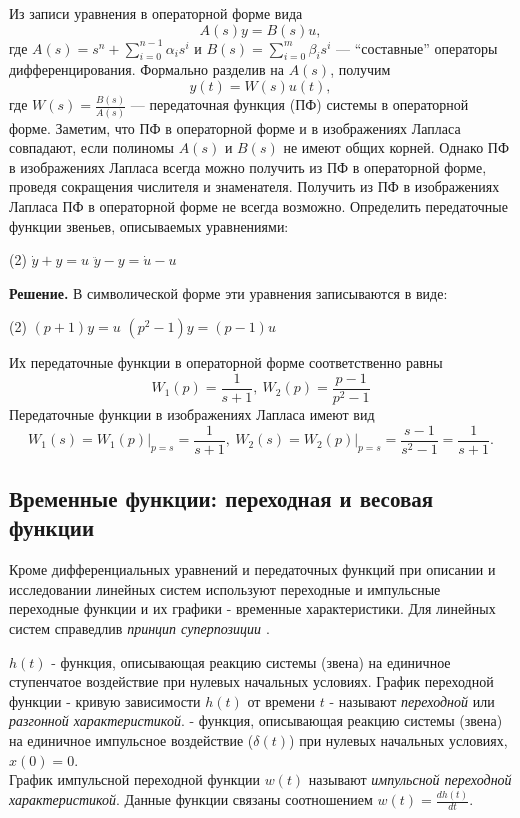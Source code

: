 \documentclass[../../TAU.tex]{subfiles}
\begin{document}
    Из записи уравнения  в операторной форме вида
    \begin{equation}\label{EQ_ODU_SYM_1}
        A(s)y = B(s)u,
    \end{equation}
    где 
    ${A(s) = s^n + \sum_{i=0}^{n-1}\alpha_is^i}$ и 
    ${B(s) = \sum_{i=0}^{m}\beta_is^i}$ --- ``составные'' операторы дифференцирования.
    Формально разделив  на $A(s)$, получим
    \begin{equation}
        y(t) = W(s)u(t),
    \end{equation}
    где 
    ${W(s) = \frac{B(s)}{A(s)}}$ --- передаточная функция (ПФ) системы  в операторной форме.
    Заметим, что ПФ в операторной форме и в изображениях Лапласа совпадают, если полиномы $A(s)$ и $B(s)$ не имеют общих корней. Однако ПФ в изображениях Лапласа всегда можно получить из ПФ в операторной форме, проведя сокращения числителя и знаменателя. Получить из ПФ в изображениях Лапласа ПФ в операторной форме не всегда возможно.
    \examp Определить передаточные функции звеньев, описываемых уравнениями:
    \begin{tasks}(2)
        \task ${\dot y + y = u}$
        \task ${\ddot y - y = \dot u - u}$
    \end{tasks}
    {\bf Решение.}
    В символической форме эти уравнения записываются в виде:
    \begin{tasks}(2)
        \task ${(p+1) y = u}$
        \task ${(p^2-1) y = (p-1) u}$
    \end{tasks}
    Их передаточные функции в операторной форме соответственно равны
    $$
        W_1(p)=\frac{1}{s+1}, \ W_2(p)= \frac{p-1}{p^2-1}
    $$
    Передаточные функции в изображениях Лапласа имеют вид
    $$
        \left.W_1(s)=W_1(p)\right\vert_{p=s} = \frac{1}{s+1}, \ 
        \left.W_2(s)=W_2(p)\right\vert_{p=s} = \frac{s-1}{s^2-1} = \frac{1}{s+1}.
    $$

\subsection{Временные функции: переходная и весовая функции} 

    Кроме дифференциальных уравнений и передаточных функций при описании и исследовании линейных систем используют переходные и импульсные переходные функции и их графики - временные характеристики.
    Для линейных систем справедлив {\it принцип суперпозиции \cite[стр. 35]{kim:uch}}. 

     $h(t)$  - функция, описывающая реакцию системы (звена) на единичное ступенчатое воздействие при нулевых начальных условиях. 
    График переходной функции - кривую зависимости $h(t)$ от времени $t$ - называют {\it переходной} или {\it разгонной характеристикой}.
    \defi{\it Импульсная переходная (весовая) функция $w(t)$} - функция, описывающая реакцию системы (звена) на единичное импульсное воздействие ($\delta(t)$) при нулевых начальных условиях, ${x(0) = 0}$.\\ 
    График импульсной переходной функции $w(t)$ называют {\it импульсной переходной характеристикой}.
    Данные функции связаны соотношением ${w(t) = \frac{dh(t)}{dt}}$.
\end{document}
